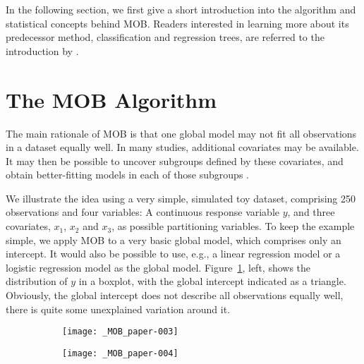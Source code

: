 \documentclass[doc,floatsintext,natbib]{apa7}
\begin{document}
In the following section, we first give a short introduction into the algorithm and statistical concepts behind MOB. Readers interested in learning more about its predecessor method, classification and regression trees, are referred to the introduction by \citet{StrMalTut:2009:PM}. 

\section{The MOB Algorithm}

The main rationale of MOB is that one global model may not fit all observations in a dataset equally well. In many studies, additional covariates may be available. It may then be possible to uncover subgroups defined by these covariates, and obtain better-fitting models in each of those subgroups \citep{ZeilyHoth08}. 


We illustrate the idea using a very simple, simulated toy dataset, comprising 250 observations and four variables: A continuous response variable $y$, and three covariates, $x_1$, $x_2$ and $x_3$, as possible partitioning variables. 
To keep the example simple, we apply MOB to a very basic global model, which comprises only an intercept. It would also be possible to use, e.g., a linear regression model or a logistic regression model as the global model. Figure~\ref{fig:toy}, left, shows the distribution of $y$ in a boxplot, with the global intercept indicated as a triangle. Obviously, the global intercept does not describe all observations equally well, there is quite some unexplained variation around it.


\begin{figure}[h]
\caption{Left: Univariate distribution of the response variable. Right: Tree with group-specific distributions of the response variable in the terminal nodes.}
\begin{subfigure}[][][t]{.4\textwidth}
\texttt{[image: \_MOB\_paper-003]}
\end{subfigure}
\begin{subfigure}[][][b]{.7\textwidth}
\texttt{[image: \_MOB\_paper-004]}
\end{subfigure}
\label{fig:toy}
\end{figure}
\end{document}

